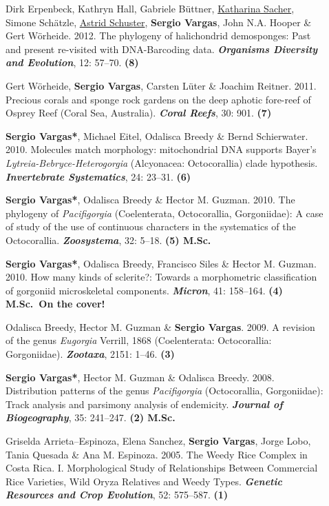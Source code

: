 \documentclass[letter,10pt]{article}
\begin{document}
\begin{description}
\item[]Dirk Erpenbeck, Kathryn Hall, Gabriele B\"uttner, \underline{Katharina Sacher}, Simone Sch\"atzle, \underline{Astrid Schuster}, \textbf{Sergio Vargas},  John N.A. Hooper \& Gert W\"orheide. 2012. The phylogeny of halichondrid demosponges: Past and present re-visited with DNA-Barcoding data. \textbf{\emph{Organisms Diversity and Evolution}}, 12: 57--70. \hfill\textbf{{\scriptsize (8)}}

\item[]Gert W\"orheide, \textbf{Sergio Vargas}, Carsten L\"uter \& Joachim Reitner. 2011. Precious corals and sponge rock gardens on the deep aphotic fore-reef of Osprey Reef (Coral Sea, Australia). \textbf{\emph{Coral Reefs}}, 30: 901. \hfill\textbf{{\scriptsize (7)}}

\item[]\textbf{Sergio Vargas*}, Michael Eitel, Odalisca Breedy \& Bernd Schierwater. 2010. Molecules match morphology: mitochondrial DNA supports Bayer's \emph{Lytreia-Bebryce-Heterogorgia} (Alcyonacea: Octocorallia) clade hypothesis. \textbf{\emph{Invertebrate Systematics}}, 24: 23--31. \hfill\textbf{{\scriptsize (6)}}

\item[]\textbf{Sergio Vargas*}, Odalisca Breedy \& Hector M. Guzman. 2010. The phylogeny of \emph{Pacifigorgia} (Coelenterata, Octocorallia, Gorgoniidae): A case of study of the use of continuous characters in the systematics of the Octocorallia. \textbf{\emph{Zoosystema}}, 32: 5--18. \hfill\textbf{{\scriptsize (5) M.Sc.}}

\item[]\textbf{Sergio Vargas*}, Odalisca Breedy, Francisco Siles \& Hector M. Guzman. 2010. How many kinds of sclerite?: Towards a morphometric classification of gorgoniid microskeletal components. \textbf{\emph{Micron}}, 41: 158--164. \hfill\textbf{{\scriptsize (4) M.Sc.~On the cover!}}

\item[]Odalisca Breedy, Hector M. Guzman \& \textbf{Sergio Vargas}. 2009. A revision of the genus \emph{Eugorgia} Verrill, 1868 (Coelenterata: Octocorallia: Gorgoniidae). \textbf{\emph{Zootaxa}}, 2151: 1--46. \hfill\textbf{{\scriptsize (3)}}

\item[]\textbf{Sergio Vargas*}, Hector M. Guzman \& Odalisca Breedy. 2008. Distribution patterns of the genus \emph{Pacifigorgia} (Octocorallia, Gorgoniidae): Track analysis and parsimony analysis of endemicity. \textbf{\emph{Journal of Biogeography}}, 35: 241--247. \hfill\textbf{{\scriptsize (2) M.Sc.}}

\item[]Griselda Arrieta--Espinoza, Elena Sanchez, \textbf{Sergio Vargas}, Jorge Lobo, Tania Quesada \& Ana M. Espinoza. 2005. The Weedy Rice Complex in Costa Rica. I. Morphological Study of Relationships Between Commercial Rice Varieties, Wild Oryza Relatives and Weedy Types. \textbf{\emph{Genetic Resources and Crop Evolution}}, 52: 575--587. \hfill\textbf{{\scriptsize (1)}}
\end{description}
\end{document}
